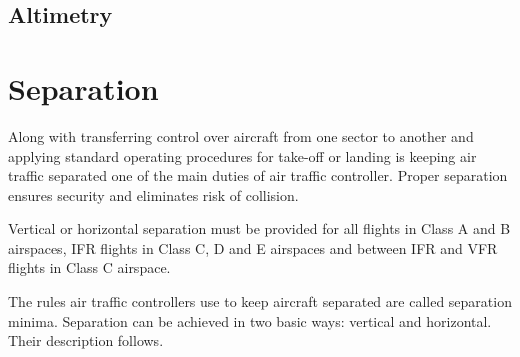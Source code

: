 \subsection{Altimetry}








\section{Separation}

Along with transferring control over aircraft from one sector to another and applying standard operating procedures for take-off or landing is keeping air traffic separated one of the main duties of air traffic controller. Proper separation ensures security and eliminates risk of collision. \cite[Chapter 2]{order7110}

Vertical or horizontal separation must be provided for all flights in Class A and B airspaces, IFR flights in Class C, D and E airspaces and between IFR and VFR flights in Class C airspace. \cite[Chapter 5]{doc4444}

The rules air traffic controllers use to keep aircraft separated are called separation minima. Separation can be achieved in two basic ways: vertical and horizontal. Their description follows.


